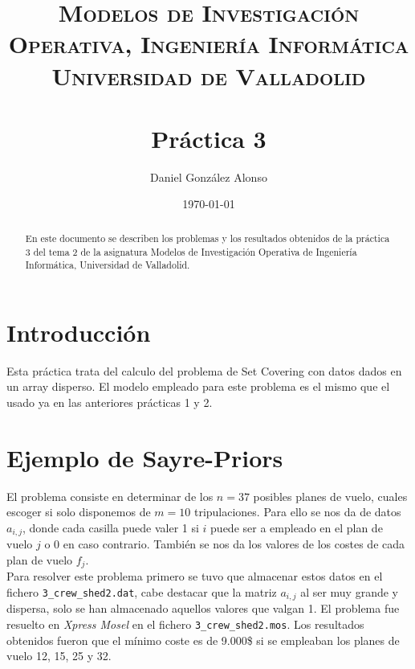 \documentclass[a4paper,11pt]{article}
\title{
	\vspace{-25pt}
	\normalfont \Large \textsc{
		Modelos de Investigación Operativa,
        Ingeniería Informática\\
        Universidad de Valladolid
	}\\[10pt]
	\horrule{1pt}\\[10pt]
	\huge \textbf{
		Práctica 3
	}\\
	\horrule{1pt}
}
\author{
	\normalfont \Large Daniel González Alonso
}
\date{
	\normalfont \large \today
}
\begin{document}
\maketitle

\begin{abstract}
	En este documento se describen los problemas y los resultados obtenidos de la práctica 3 del tema 2 de la asignatura Modelos de Investigación Operativa de Ingeniería Informática, Universidad de Valladolid.
\end{abstract}

\section{Introducción}
Esta práctica trata del calculo del problema de Set Covering con datos dados en un array disperso. El modelo empleado para este problema es el mismo que el usado ya en las anteriores prácticas 1 y 2.

\section{Ejemplo de Sayre-Priors}

El problema consiste en determinar de los ${n=37}$ posibles planes de vuelo, cuales escoger si solo disponemos de ${m=10}$ tripulaciones. Para ello se nos da de datos ${a_{i,j}}$, donde cada casilla puede valer 1 si ${i}$ puede ser a empleado en el plan de vuelo ${j}$ o 0 en caso contrario. También se nos da los valores de los costes de cada plan de vuelo ${f_j}$.\\

Para resolver este problema primero se tuvo que almacenar estos datos en el fichero \texttt{3\_crew\_shed2.dat}, cabe destacar que la matriz ${a_{i,j}}$ al ser muy grande y dispersa, solo se han almacenado aquellos valores que valgan 1. El problema fue resuelto en \textit{Xpress Mosel} en el fichero \texttt{3\_crew\_shed2.mos}. Los resultados obtenidos fueron que el mínimo coste es de 9.000\$ si se empleaban los planes de vuelo 12, 15, 25 y 32.
\end{document}
